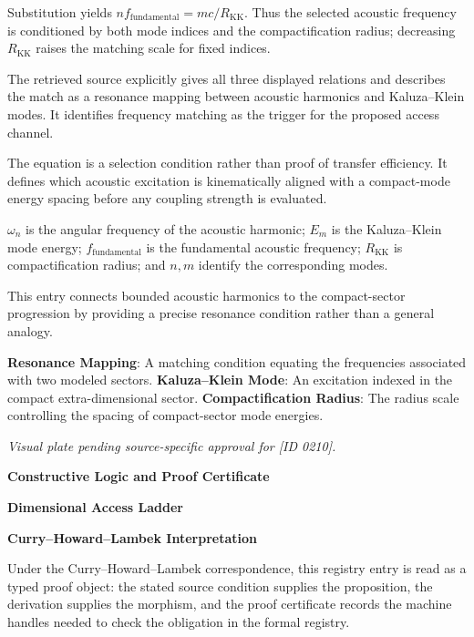 Substitution yields \(n f_{\mathrm{fundamental}}=m c/R_{\mathrm{KK}}\). Thus the selected acoustic frequency is conditioned by both mode indices and the compactification radius; decreasing \(R_{\mathrm{KK}}\) raises the matching scale for fixed indices.


The retrieved source explicitly gives all three displayed relations and describes the match as a resonance mapping between acoustic harmonics and Kaluza--Klein modes. It identifies frequency matching as the trigger for the proposed access channel.


The equation is a selection condition rather than proof of transfer efficiency. It defines which acoustic excitation is kinematically aligned with a compact-mode energy spacing before any coupling strength is evaluated.


\(\omega_n\) is the angular frequency of the acoustic harmonic; \(E_m\) is the Kaluza--Klein mode energy; \(f_{\mathrm{fundamental}}\) is the fundamental acoustic frequency; \(R_{\mathrm{KK}}\) is compactification radius; and \(n,m\) identify the corresponding modes.


This entry connects bounded acoustic harmonics to the compact-sector progression by providing a precise resonance condition rather than a general analogy.


\noindent \textbf{Resonance Mapping}: A matching condition equating the frequencies associated with two modeled sectors. \enspace\textbullet\enspace \textbf{Kaluza--Klein Mode}: An excitation indexed in the compact extra-dimensional sector. \enspace\textbullet\enspace \textbf{Compactification Radius}: The radius scale controlling the spacing of compact-sector mode energies.\par

\endgroup

\begingroup\footnotesize\itshape
Visual plate pending source-specific approval for [ID 0210].
\par\endgroup

\clearpage
\begingroup\tzpsupportsetup
\noindent\textbf{\fontsize{10.8pt}{12.8pt}\selectfont [ID 0210] Constructive Logic and Proof Certificate}\par
\noindent\textbf{\fontsize{10pt}{12pt}\selectfont Dimensional Access Ladder}\par
\vspace{0.45em}
\begingroup
\footnotesize
\setlength{\parskip}{0.22em}
\setlength{\parindent}{0pt}
\noindent\textbf{Curry--Howard--Lambek Interpretation}\par
Under the Curry--Howard--Lambek correspondence, this registry entry is read as a typed proof
object: the stated source condition supplies the proposition, the derivation supplies the
morphism, and the proof certificate records the machine handles needed to check the obligation
in the formal registry.

